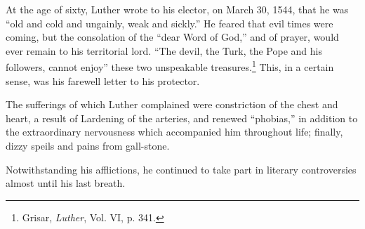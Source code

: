 At the age of sixty, Luther wrote to his elector, on March 30, 1544,
that he was “old and cold and ungainly, weak and sickly.” He feared
that evil times were coming, but the consolation of the “dear Word of
God,” and of prayer, would ever remain to his territorial lord. “The
devil, the Turk, the Pope and his followers, cannot enjoy” these
two unspeakable treasures.\footnote{Grisar, \textit{Luther}, Vol. VI, p. 341.}
This, in a certain sense, was his farewell
letter to his protector.

The sufferings of which Luther complained were constriction of
the chest and heart, a result of Lardening of the arteries, and renewed
“phobias,” in addition to the extraordinary nervousness which
accompanied him throughout life; finally, dizzy speils and pains from
gall-stone.

Notwithstanding his afflictions, he continued to take part in literary
controversies almost until his last breath.


